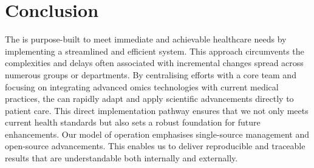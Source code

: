 \section{Conclusion}
The \pmu is purpose-built to meet immediate and achievable healthcare needs by implementing a streamlined and efficient system. 
This approach circumvents the complexities and delays often associated with incremental changes spread across numerous groups or departments. 
By centralising efforts with a core team and focusing on integrating advanced omics technologies with current medical practices, the \pmu can rapidly adapt and apply scientific advancements directly to patient care. 
This direct implementation pathway ensures that we not only meets current health standards but also sets a robust foundation for future enhancements.
Our model of operation emphasises single-source management and open-source advancements. 
This enables us to deliver reproducible and traceable results that are understandable both internally and externally.